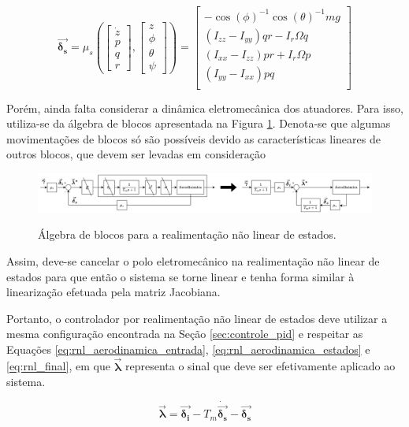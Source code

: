 \documentclass[main.tex]{subfiles}
\begin{document}
	
	\begin{equation}\label{eq:rnl_aerodinamica_estados}
		\boldsymbol{\vec{\delta_s}} = \mu_s\left(\begin{bmatrix}
			\dot{z}\\
			p\\
			q\\
			r
		\end{bmatrix}, \begin{bmatrix}
			z\\
			\phi\\
			\theta\\
			\psi
		\end{bmatrix}\right) = \begin{bmatrix}
			-\cos(\phi)^{-1}\cos(\theta)^{-1}mg\\
			(I_{zz} - I_{yy})qr - I_r\Omega q\\
			(I_{xx} - I_{zz})pr + I_r\Omega p\\
			(I_{yy} - I_{xx})pq\\
		\end{bmatrix}
	\end{equation}
	
	Porém, ainda falta considerar a dinâmica eletromecânica dos atuadores. Para isso, utiliza-se da álgebra de blocos apresentada na Figura \ref{fig:algebra_blocos}. Denota-se que algumas movimentações de blocos só são possíveis devido as características lineares de outros blocos, que devem ser levadas em consideração
	
	\begin{figure}[!h]
		\centering
		\caption{Álgebra de blocos para a realimentação não linear de estados.}
		\includegraphics[width=1\textwidth]{capitulos/controle_atitude/imgs/algebra_blocos.png}
		\label{fig:algebra_blocos}
	\end{figure}
	
	Assim, deve-se cancelar o polo eletromecânico na realimentação não linear de estados para que então o sistema se torne linear e tenha forma similar à linearização efetuada pela matriz Jacobiana. 
	
	Portanto, o controlador por realimentação não linear de estados deve utilizar a mesma configuração encontrada na Seção \ref{sec:controle_pid} e respeitar as Equações \ref{eq:rnl_aerodinamica_entrada}, \ref{eq:rnl_aerodinamica_estados} e \ref{eq:rnl_final}, em que $\boldsymbol{\vec{\lambda}}$ representa o sinal que deve ser efetivamente aplicado ao sistema.
	
	\begin{equation}\label{eq:rnl_final}
		\boldsymbol{\vec{\lambda}} = \boldsymbol{\vec{\delta_i}} - T_m\boldsymbol{\dot{\vec{\delta_s}}} - \boldsymbol{\vec{\delta_s}}
	\end{equation}
	
	
\end{document}
